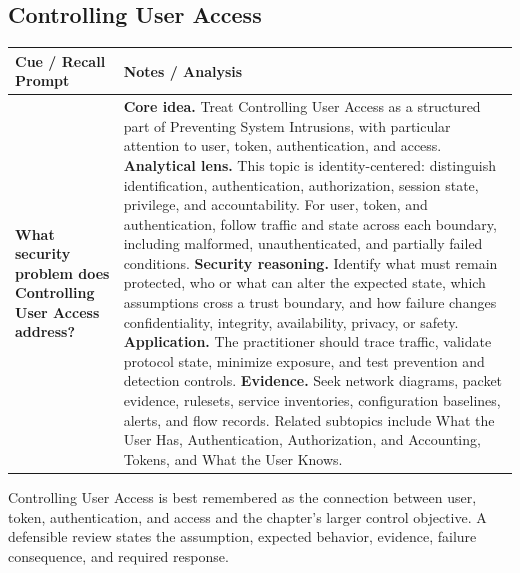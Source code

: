 \documentclass[11pt]{article}
\newcommand{\CornellHeader}{%
\rowcolor{Navy}\color{white}\bfseries Cue / Recall Prompt & \color{white}\bfseries Notes / Analysis\\\hline}
\newcommand{\CornellRow}[2]{%
\cellcolor{CueGray}\RaggedRight\textbf{#1} & \RaggedRight #2\\\hline}
\begin{document}
\subsection*{Controlling User Access}
\begin{longtable}{>{\RaggedRight\arraybackslash}p{}|>{\RaggedRight\arraybackslash}p{}}
\CornellHeader
\CornellRow{What security problem does Controlling User Access address?}{\textbf{Core idea.} Treat Controlling User Access as a structured part of Preventing System Intrusions, with particular attention to user, token, authentication, and access. \textbf{Analytical lens.} This topic is identity-centered: distinguish identification, authentication, authorization, session state, privilege, and accountability. For user, token, and authentication, follow traffic and state across each boundary, including malformed, unauthenticated, and partially failed conditions. \textbf{Security reasoning.} Identify what must remain protected, who or what can alter the expected state, which assumptions cross a trust boundary, and how failure changes confidentiality, integrity, availability, privacy, or safety. \textbf{Application.} The practitioner should trace traffic, validate protocol state, minimize exposure, and test prevention and detection controls. \textbf{Evidence.} Seek network diagrams, packet evidence, rulesets, service inventories, configuration baselines, alerts, and flow records. Related subtopics include What the User Has, Authentication, Authorization, and Accounting, Tokens, and What the User Knows.}
\end{longtable}
\begin{topicsummary}
Controlling User Access is best remembered as the connection between user, token, authentication, and access and the chapter's larger control objective. A defensible review states the assumption, expected behavior, evidence, failure consequence, and required response.
\end{topicsummary}
\end{document}
